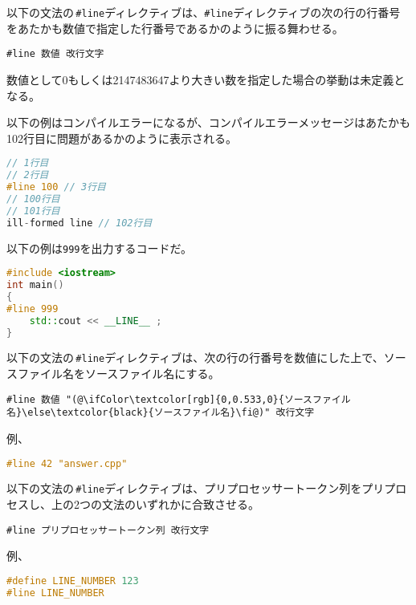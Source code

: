 以下の文法の\,\texttt{\#line}ディレクティブは、\texttt{\#line}ディレクティブの次の行の行番号をあたかも数値で指定した行番号であるかのように振る舞わせる。

\begin{lstlisting}[style=grammar]
#line 数値 改行文字
\end{lstlisting}

数値として0もしくは2147483647より大きい数を指定した場合の挙動は未定義となる。

以下の例はコンパイルエラーになるが、コンパイルエラーメッセージはあたかも102行目に問題があるかのように表示される。

\begin{lstlisting}[language={C++}]
// 1行目
// 2行目
#line 100 // 3行目
// 100行目
// 101行目
ill-formed line // 102行目
\end{lstlisting}

以下の例は\texttt{999}を出力するコードだ。

\ifTombow\pagebreak\fi
\begin{lstlisting}[language={C++}]
#include <iostream>
int main()
{
#line 999
    std::cout << __LINE__ ;
}
\end{lstlisting}

以下の文法の\,\texttt{\#line}ディレクティブは、次の行の行番号を数値にした上で、ソースファイル名をソースファイル名にする。

\begin{lstlisting}[style=grammar]
#line 数値 "(@\ifColor\textcolor[rgb]{0,0.533,0}{ソースファイル名}\else\textcolor{black}{ソースファイル名}\fi@)" 改行文字
\end{lstlisting}

例、

\begin{lstlisting}[language={C++}]
#line 42 "answer.cpp"
\end{lstlisting}

以下の文法の\,\texttt{\#line}ディレクティブは、プリプロセッサートークン列をプリプロセスし、上の2つの文法のいずれかに合致させる。

\begin{lstlisting}[style=grammar]
#line プリプロセッサートークン列 改行文字
\end{lstlisting}

例、

\begin{lstlisting}[language={C++}]
#define LINE_NUMBER 123
#line LINE_NUMBER
\end{lstlisting}

